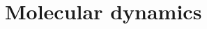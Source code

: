 \documentclass[twoside,english,a4paper]{uiofysmaster}
\begin{document}
\part{Molecular dynamics}
% 
% 
% 
% 
\end{document}
